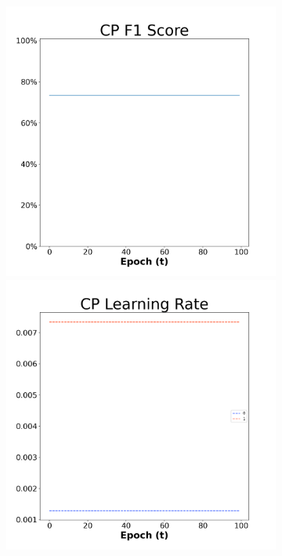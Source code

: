 \begin{figure}[H]
  \centering %
\begin{subfigure}{0.3\textwidth}
\includegraphics[width=\linewidth]{images/exper2/SP/CP_0.01_f1.png}
  \includegraphics[width=\linewidth]{images/exper2/SP/CP_0.01_lr.png}

\end{subfigure}
\end{figure}
